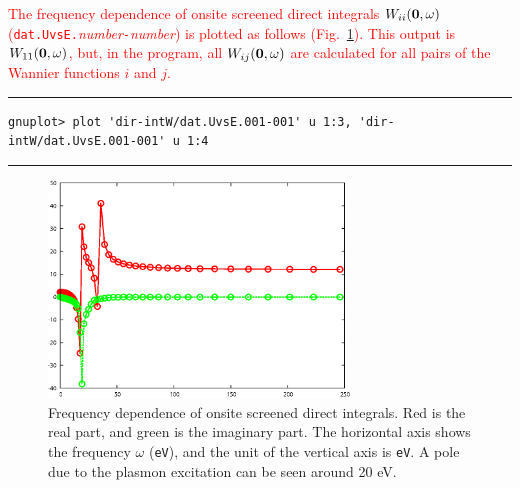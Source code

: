 \documentclass{article}
\newcommand{\tr}[1]{\textcolor{red}{#1}}
\begin{document}
\tr{The frequency dependence of onsite screened direct integrals $W_{ii}({\bf 0},\omega)$ ({\tt dat.UvsE.}{\it number}{\tt -}{\it number}) is plotted as follows (Fig.~\ref{UvsE}). This output is $W_{11}({\bf 0},\omega)$, but, in the program, all $W_{ij}({\bf 0},\omega)$ are calculated for all pairs of the Wannier functions $i$ and $j$.}  
\vspace{3mm}\hrule
\begin{verbatim}
gnuplot> plot 'dir-intW/dat.UvsE.001-001' u 1:3, 'dir-intW/dat.UvsE.001-001' u 1:4  
\end{verbatim}
\hrule\vspace{3mm}
\begin{figure}[H] 
\centering
\includegraphics[width=8cm]{UvsE-Al.eps}
\caption{Frequency dependence of onsite screened direct integrals. Red is the real part, and green is the imaginary part. The horizontal axis shows the frequency $\omega$ ({\tt eV}), and the unit of the vertical axis is {\tt eV}. A pole due to the plasmon excitation can be seen around 20 eV.}
\label{UvsE}
\end{figure}
\end{document}
